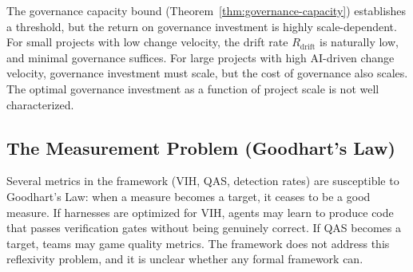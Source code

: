 The governance capacity bound (Theorem~\ref{thm:governance-capacity}) establishes a threshold, but the return on governance investment is highly scale-dependent. For small projects with low change velocity, the drift rate $R_{\text{drift}}$ is naturally low, and minimal governance suffices. For large projects with high AI-driven change velocity, governance investment must scale, but the cost of governance also scales. The optimal governance investment as a function of project scale is not well characterized.

\subsection{The Measurement Problem (Goodhart's Law)}

Several metrics in the framework (VIH, QAS, detection rates) are susceptible to Goodhart's Law: when a measure becomes a target, it ceases to be a good measure. If harnesses are optimized for VIH, agents may learn to produce code that passes verification gates without being genuinely correct. If QAS becomes a target, teams may game quality metrics. The framework does not address this reflexivity problem, and it is unclear whether any formal framework can.


